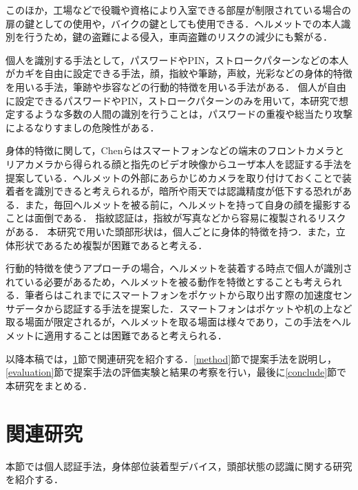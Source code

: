 \documentclass[Japanese,noauthor]{dicomopapers}
\begin{document}
このほか，工場などで役職や資格により入室できる部屋が制限されている場合の扉の鍵としての使用や，バイクの鍵としても使用できる．ヘルメットでの本人識別を行うため，鍵の盗難による侵入，車両盗難のリスクの減少にも繋がる．\par

個人を識別する手法として，パスワードやPIN，ストロークパターンなどの本人がカギを自由に設定できる手法，顔，指紋や筆跡，声紋，光彩などの身体的特徴を用いる手法，筆跡や歩容などの行動的特徴を用いる手法がある．
個人が自由に設定できるパスワードやPIN，ストロークパターンのみを用いて，本研究で想定するような多数の人間の識別を行うことは，パスワードの重複や総当たり攻撃によるなりすましの危険性がある．

身体的特徴に関して，Chenら\cite{face_and_finger}はスマートフォンなどの端末のフロントカメラとリアカメラから得られる顔と指先のビデオ映像からユーザ本人を認証する手法を提案している．ヘルメットの外部にあらかじめカメラを取り付けておくことで装着者を識別できると考えられるが，暗所や雨天では認識精度が低下する恐れがある．また，毎回ヘルメットを被る前に，ヘルメットを持って自身の顔を撮影することは面倒である．
指紋認証\cite{finger_CNN}は，指紋が写真などから容易に複製されるリスクがある．
本研究で用いた頭部形状は，個人ごとに身体的特徴を持つ．また，立体形状であるため複製が困難であると考える．

行動的特徴を使うアプローチの場合，ヘルメットを装着する時点で個人が識別されている必要があるため，ヘルメットを被る動作を特徴とすることも考えられる．筆者らはこれまでにスマートフォンをポケットから取り出す際の加速度センサデータから認証する手法\cite{murao_screen_unlock}を提案した．スマートフォンはポケットや机の上など取る場面が限定されるが，ヘルメットを取る場面は様々であり，この手法をヘルメットに適用することは困難であると考えられる．

以降本稿では，\ref{related}節で関連研究を紹介する．\ref{method}節で提案手法を説明し，\ref{evaluation}節で提案手法の評価実験と結果の考察を行い，最後に\ref{conclude}節で本研究をまとめる．


\section{関連研究}
\label{related}
本節では個人認証手法，身体部位装着型デバイス，頭部状態の認識に関する研究を紹介する．
\end{document}
